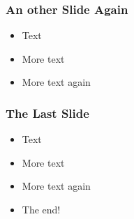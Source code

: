 \begin{frame} 
\frametitle{An other Slide Again}
\begin{itemize}[<+->]
 \item Text
 \item More text
 \item More text again
\end{itemize}
\end{frame}

\begin{frame} 
\frametitle{The Last Slide}
\begin{itemize}[<+->]
 \item Text
 \item More text
 \item More text again
 \item The end!
\end{itemize}
\end{frame}


